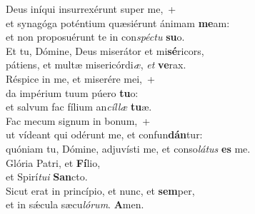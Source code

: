 \oddverse Deus iníqui insurrexérunt super me,~+\\
\oddverse  et synagóga poténtium quæsiérunt ánimam \textbf{me}am:~\*\\
\oddverse et non proposuérunt te in con\textit{spé}\textit{ctu} \textbf{su}o.\\
\evenverse Et tu, Dómine, Deus miserátor et mi\textbf{sé}ricors,~\*\\
\evenverse pátiens, et multæ misericórdi\textit{æ}, \textit{et} \textbf{ve}rax.\\
\oddverse Réspice in me, et miserére mei,~+\\
\oddverse  da impérium tuum púero \textbf{tu}o:~\*\\
\oddverse et salvum fac fílium an\textit{cíl}\textit{læ} \textbf{tu}æ.\\
\evenverse Fac mecum signum in bonum,~+\\
\evenverse  ut vídeant qui odérunt me, et confun\textbf{dán}tur:~\*\\
\evenverse quóniam tu, Dómine, adjuvísti me, et conso\textit{lá}\textit{tus} \textbf{es} me.\\
\oddverse Glória Patri, et \textbf{Fí}lio,~\*\\
\oddverse et Spirí\textit{tu}\textit{i} \textbf{San}cto.\\
\evenverse Sicut erat in princípio, et nunc, et \textbf{sem}per,~\*\\
\evenverse et in sǽcula sæcu\textit{ló}\textit{rum}. \textbf{A}men.\\
